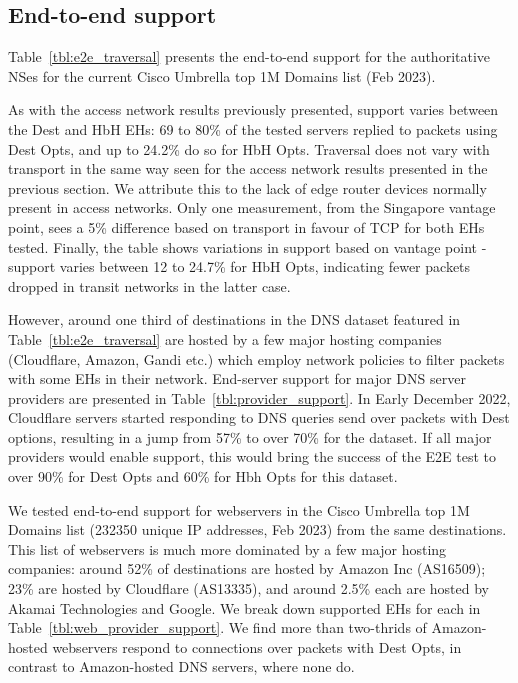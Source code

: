 \documentclass[conference]{IEEEtran}
\begin{document}
\subsection{End-to-end support}
\label{subsec:e2esupport}

Table~\ref{tbl:e2e_traversal} presents the end-to-end support for the authoritative NSes for the current Cisco Umbrella top 1M Domains list (Feb 2023).

As with the access network results previously presented, support varies between the Dest and HbH EHs: 69 to 80\% of the tested servers replied to packets using Dest Opts, and up to 24.2\% do so for HbH Opts. Traversal does not vary with transport in the same way seen for the access network results presented in the previous section. We attribute this to the lack of edge router devices normally present in access networks. Only one measurement, from the Singapore vantage point, sees a 5\% difference based on transport in favour of TCP for both EHs tested.
Finally, the table shows variations in support based on vantage point - support varies between 12 to 24.7\% for HbH Opts, indicating fewer packets dropped in transit networks in the latter case.

However, around one third of destinations in the DNS dataset featured in Table~\ref{tbl:e2e_traversal} are hosted by a few major hosting companies (Cloudflare, Amazon, Gandi etc.) which employ network policies to filter packets with some EHs in their network. End-server support for major DNS server providers are presented in Table~\ref{tbl:provider_support}. In Early December 2022, Cloudflare servers started responding to DNS queries send over packets with Dest options, resulting in a jump from 57\% to over 70\% for the dataset. If all major providers would enable support, this would bring the success of the E2E test to over 90\% for Dest Opts and 60\% for Hbh Opts for this dataset.

We tested end-to-end support for webservers in the Cisco Umbrella top 1M Domains list (232350 unique IP addresses, Feb 2023) from the same destinations. This list of webservers is much more dominated by a few major hosting companies: around 52\% of destinations are hosted by Amazon Inc (AS16509); 23\% are hosted by Cloudflare (AS13335), and around 2.5\% each are hosted by Akamai Technologies and Google. We break down supported EHs for each in Table~\ref{tbl:web_provider_support}. We find more than two-thrids of Amazon-hosted webservers respond to connections over packets with Dest Opts, in contrast to Amazon-hosted DNS servers, where none do. 
\end{document}
